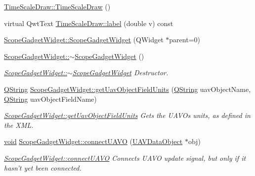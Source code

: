 \begin{DoxyCompactItemize}
\item 
\hyperlink{group___scope_plugin_ga84399225e78ebb91c66163a637662f2a}{\-Time\-Scale\-Draw\-::\-Time\-Scale\-Draw} ()
\item 
virtual \-Qwt\-Text \hyperlink{group___scope_plugin_gadd46f1edfb468453018c231b7a1e92f2}{\-Time\-Scale\-Draw\-::label} (double v) const 
\item 
\hyperlink{group___scope_plugin_ga2810fbb794c4531b885259a5100bcf79}{\-Scope\-Gadget\-Widget\-::\-Scope\-Gadget\-Widget} (\-Q\-Widget $\ast$parent=0)
\item 
\hyperlink{group___scope_plugin_gaa4f8465d4475c6035056db0bb194b9fa}{\-Scope\-Gadget\-Widget\-::$\sim$\-Scope\-Gadget\-Widget} ()
\begin{DoxyCompactList}\small\item\em \hyperlink{group___scope_plugin_gaa4f8465d4475c6035056db0bb194b9fa}{\-Scope\-Gadget\-Widget\-::$\sim$\-Scope\-Gadget\-Widget} \-Destructor. \end{DoxyCompactList}\item 
\hyperlink{group___u_a_v_objects_plugin_gab9d252f49c333c94a72f97ce3105a32d}{\-Q\-String} \hyperlink{group___scope_plugin_ga4fc130c09e788ead2fe9da284efb780b}{\-Scope\-Gadget\-Widget\-::get\-Uav\-Object\-Field\-Units} (\hyperlink{group___u_a_v_objects_plugin_gab9d252f49c333c94a72f97ce3105a32d}{\-Q\-String} uav\-Object\-Name, \hyperlink{group___u_a_v_objects_plugin_gab9d252f49c333c94a72f97ce3105a32d}{\-Q\-String} uav\-Object\-Field\-Name)
\begin{DoxyCompactList}\small\item\em \hyperlink{group___scope_plugin_ga4fc130c09e788ead2fe9da284efb780b}{\-Scope\-Gadget\-Widget\-::get\-Uav\-Object\-Field\-Units} \-Gets the \-U\-A\-V\-Os units, as defined in the \-X\-M\-L. \end{DoxyCompactList}\item 
\hyperlink{group___u_a_v_objects_plugin_ga444cf2ff3f0ecbe028adce838d373f5c}{void} \hyperlink{group___scope_plugin_gae48ddd25c6bea599893a60ab02c375bf}{\-Scope\-Gadget\-Widget\-::connect\-U\-A\-V\-O} (\hyperlink{class_u_a_v_data_object}{\-U\-A\-V\-Data\-Object} $\ast$obj)
\begin{DoxyCompactList}\small\item\em \hyperlink{group___scope_plugin_gae48ddd25c6bea599893a60ab02c375bf}{\-Scope\-Gadget\-Widget\-::connect\-U\-A\-V\-O} \-Connects \-U\-A\-V\-O update signal, but only if it hasn't yet been connected. \end{DoxyCompactList}\item 

\end{DoxyCompactItemize}
